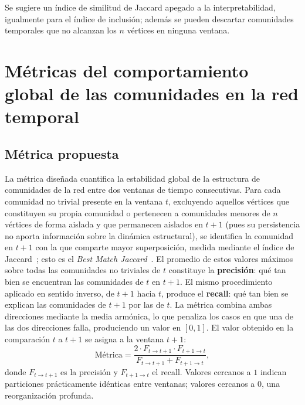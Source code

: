 \documentclass[12pt]{article}
\begin{document}
Se sugiere un índice de similitud de Jaccard apegado a la interpretabilidad, igualmente para el índice de inclusión; además se pueden descartar comunidades temporales que no alcanzan los $n$ vértices en ninguna ventana.

\section{Métricas del comportamiento global de las comunidades en la red temporal}
\label{sec:metricas}

\subsection{Métrica propuesta}
La métrica diseñada cuantifica la estabilidad global de la estructura de comunidades de la red entre dos ventanas de tiempo consecutivas. Para cada comunidad no trivial presente en la ventana $t$, excluyendo aquellos vértices que constituyen su propia comunidad o pertenecen a comunidades menores de $n$ vértices de forma aislada y que permanecen aislados en $t+1$ (pues su persistencia no aporta información sobre la dinámica estructural), se identifica la comunidad en $t+1$ con la que comparte mayor superposición, medida mediante el índice de Jaccard~\cite{ref:jaccard}; esto es el \textit{Best Match Jaccard}~\cite{ref:bestmatch}. El promedio de estos valores máximos sobre todas las comunidades no triviales de $t$ constituye la \textbf{precisión}: qué tan bien se encuentran las comunidades de $t$ en $t+1$. El mismo procedimiento aplicado en sentido inverso, de $t+1$ hacia $t$, produce el \textbf{recall}: qué tan bien se explican las comunidades de $t+1$ por las de $t$. La métrica combina ambas direcciones mediante la media armónica, lo que penaliza los casos en que una de las dos direcciones falla, produciendo un valor en $[0,1]$. El valor obtenido en la comparación $t$ a $t+1$ se asigna a la ventana $t+1$:
\begin{equation}
\text{Métrica} = \frac{2 \cdot F_{t \to t+1} \cdot F_{t+1 \to t}}{F_{t \to t+1} + F_{t+1 \to t}},
\label{eq:fhc}
\end{equation}
donde $F_{t \to t+1}$ es la precisión y $F_{t+1 \to t}$ el recall. Valores cercanos a $1$ indican particiones prácticamente idénticas entre ventanas; valores cercanos a $0$, una reorganización profunda.
\end{document}

